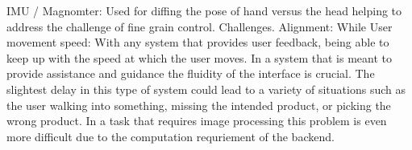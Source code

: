 IMU / Magnomter:
Used for diffing the pose of hand versus the head helping to address the challenge of fine grain control.
Challenges.
Alignment:
While 
User movement speed:
With any system that provides user feedback, being able to keep up with the speed at which the user moves. In a system that is meant to provide assistance and guidance the fluidity of the interface is crucial. The slightest delay in this type of system could lead to a variety of situations such as the user walking into something, missing the intended product, or picking the wrong product. In a task that requires image processing this problem is even more difficult due to the computation requriement of the backend.



